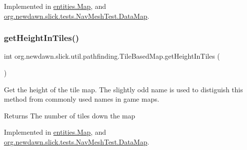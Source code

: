 Implemented in \mbox{\hyperlink{classentities_1_1_map_a251d9d490fc34a64fa2b67798c9a44a7}{entities.\+Map}}, and \mbox{\hyperlink{classorg_1_1newdawn_1_1slick_1_1tests_1_1_nav_mesh_test_1_1_data_map_a94ee56daa57d506c05a25d4198032ba8}{org.\+newdawn.\+slick.\+tests.\+Nav\+Mesh\+Test.\+Data\+Map}}.

\mbox{\label{interfaceorg_1_1newdawn_1_1slick_1_1util_1_1pathfinding_1_1_tile_based_map_a9669f3dafa1ce48a20e3d7d8c1de239a}} 
\subsubsection{\texorpdfstring{get\+Height\+In\+Tiles()}{getHeightInTiles()}}
{\footnotesize\ttfamily int org.\+newdawn.\+slick.\+util.\+pathfinding.\+Tile\+Based\+Map.\+get\+Height\+In\+Tiles (\begin{DoxyParamCaption}{ }\end{DoxyParamCaption})}

Get the height of the tile map. The slightly odd name is used to distiguish this method from commonly used names in game maps.

\begin{DoxyReturn}{Returns}
The number of tiles down the map 
\end{DoxyReturn}


Implemented in \mbox{\hyperlink{classentities_1_1_map_ae174e8e21c6307ea9058905778480ec1}{entities.\+Map}}, and \mbox{\hyperlink{classorg_1_1newdawn_1_1slick_1_1tests_1_1_nav_mesh_test_1_1_data_map_a17b7ae15c28e0d59d4ef2f789f13dad9}{org.\+newdawn.\+slick.\+tests.\+Nav\+Mesh\+Test.\+Data\+Map}}.

\mbox{\label{interfaceorg_1_1newdawn_1_1slick_1_1util_1_1pathfinding_1_1_tile_based_map_a5efac540b233405c4ae65b784a7c6d22}} 
